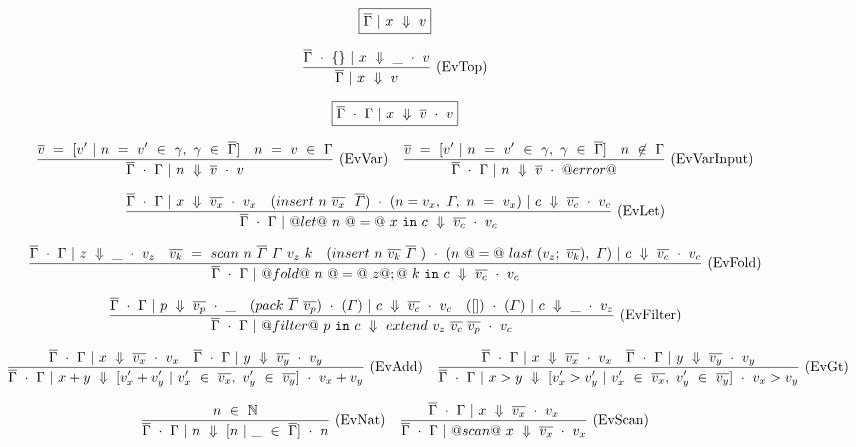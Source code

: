 
\begin{figure*}

$$
\boxed{\ov{\Gamma} ~|~ x ~\Downarrow~ v}
$$

$$
\ruleI
{
    \ov{\Gamma}~\cdot~\{\} ~|~ x ~\Downarrow~ \_ ~\cdot~ v
}
{
    \ov{\Gamma} ~|~ x ~\Downarrow~ v
}
\textrm{(EvTop)}
$$

$$
\boxed{\BigstepG{x}{\ov{v}}{v}}
$$


$$
\ruleI
{
    \ov{v} ~=~ [ v' ~|~ n ~=~ v' ~\in~ \gamma,~ \gamma ~\in~ \ov{\Gamma} ]
    \quad
    n ~=~ v ~\in~ \Gamma
}
{ 
    \BigstepG{n}{\ov{v}}{v}
}
\textrm{(EvVar)}
\quad
\ruleI
{
    \ov{v} ~=~ [ v' ~|~ n ~=~ v' ~\in~ \gamma,~ \gamma ~\in~ \ov{\Gamma} ]
    \quad
    n ~\not\in~ \Gamma
}
{ 
    \BigstepG{n}{\ov{v}}{@error@}
}
\textrm{(EvVarInput)}
$$

$$
\ruleI
{
    \BigstepG{x}{\ov{v_x}}{v_x}
    \quad
    \Bigstep{\BigstepInsert{n}{\ov{v_x}}{~\ov{\Gamma}}}{n=v_x,~\Gamma,~n~=~v_x}{c}{\ov{v_c}}{v_c}
}
{
    \BigstepG{@let@~n~@=@~x~\flowsinto~c}{\ov{v_c}}{v_c}
}
\textrm{(EvLet)}
$$

$$
\ruleI
{
    \BigstepG{z}{\_}{v_z}
    \quad
    \ov{v_k}~=~\mit{scan}~n~\ov{\Gamma}~\Gamma~v_z~k
    \quad
    \Bigstep{\BigstepInsert{n}{\ov{v_k}{~\ov{\Gamma}}}}{n~@=@~\mit{last}~(v_z;~\ov{v_k}),~\Gamma}{c}{\ov{v_c}}{v_c}
}
{
    \BigstepG{@fold@~n~@=@~z@;@~k~\flowsinto~c}{\ov{v_c}}{v_c}
}
\textrm{(EvFold)}
$$

$$
\ruleI
{
    \BigstepG{p}{\ov{v_p}}{\_}
    \quad
    \Bigstep{\mit{pack}~\ov{\Gamma}~\ov{v_p}}{\Gamma}{c}{\ov{v_c}}{v_c}
    \quad
    \Bigstep{[]}{\Gamma}{c}{\_}{v_z}
}
{
    \BigstepG{@filter@~p~\flowsinto~c}{\mit{extend}~v_z~\ov{v_c}~\ov{v_p}}{v_c}
}
\textrm{(EvFilter)}
$$



$$
\ruleI
{
    \BigstepG{x}{\ov{v_x}}{v_x}
    \quad
    \BigstepG{y}{\ov{v_y}}{v_y}
}
{
    \BigstepG{x+y}{[v_x'+v_y'~|~v_x'~\in~\ov{v_x},~v_y'~\in~\ov{v_y}]}{v_x+v_y}
}
\textrm{(EvAdd)}
\quad
\ruleI
{
    \BigstepG{x}{\ov{v_x}}{v_x}
    \quad
    \BigstepG{y}{\ov{v_y}}{v_y}
}
{
    \BigstepG{x>y}{[v_x'>v_y'~|~v_x'~\in~\ov{v_x},~v_y'~\in~\ov{v_y}]}{v_x>v_y}
}
\textrm{(EvGt)}
$$

$$
\ruleI
{
    n~\in~\NN
}
{
    \BigstepG{n}{[n~|~\_~\in~\ov{\Gamma}]}{n}
}
\textrm{(EvNat)}
\quad
\ruleI
{
    \BigstepG{x}{\ov{v_x}}{v_x}
}
{
    \BigstepG{@scan@~x}{\ov{v_x}}{v_x}
}
\textrm{(EvScan)}
$$




\end{figure*}
